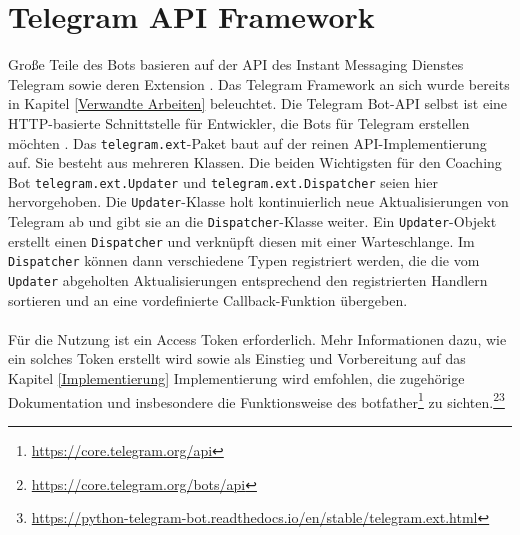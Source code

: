     \section{Telegram API Framework}
        Große Teile des Bots basieren auf der API des Instant Messaging Dienstes Telegram\cite{telegramAPI} sowie deren Extension \cite{telegramAPIext}. Das Telegram Framework an sich wurde bereits in Kapitel \ref*{Verwandte Arbeiten} beleuchtet. Die Telegram Bot-API selbst ist eine HTTP-basierte Schnittstelle für Entwickler, die Bots für Telegram erstellen möchten \cite{core_telegram_api}. Das \verb|telegram.ext|-Paket baut auf der reinen API-Implementierung auf. Sie besteht aus mehreren Klassen. Die beiden Wichtigsten für den Coaching Bot \verb|telegram.ext.Updater| und \verb|telegram.ext.Dispatcher| seien hier hervorgehoben. Die \verb|Updater|-Klasse holt kontinuierlich neue Aktualisierungen von Telegram ab und gibt sie an die \verb|Dispatcher|-Klasse weiter. Ein \verb|Updater|-Objekt erstellt einen \verb|Dispatcher| und verknüpft diesen mit einer Warteschlange. Im \verb|Dispatcher| können dann verschiedene Typen registriert werden, die die vom \verb|Updater| abgeholten Aktualisierungen entsprechend den registrierten Handlern sortieren und an eine vordefinierte Callback-Funktion übergeben. \\ 
        \\
        Für die Nutzung ist ein Access Token erforderlich.\cite{telegram_ext_intro} Mehr Informationen dazu, wie ein solches Token erstellt wird sowie als Einstieg und Vorbereitung auf das Kapitel \ref*{Implementierung} Implementierung wird emfohlen, die zugehörige Dokumentation und insbesondere die Funktionsweise des botfather\footnote{\url{https://core.telegram.org/api}} zu sichten.\footnote{\url{https://core.telegram.org/bots/api}}\footnote{\url{https://python-telegram-bot.readthedocs.io/en/stable/telegram.ext.html}}


